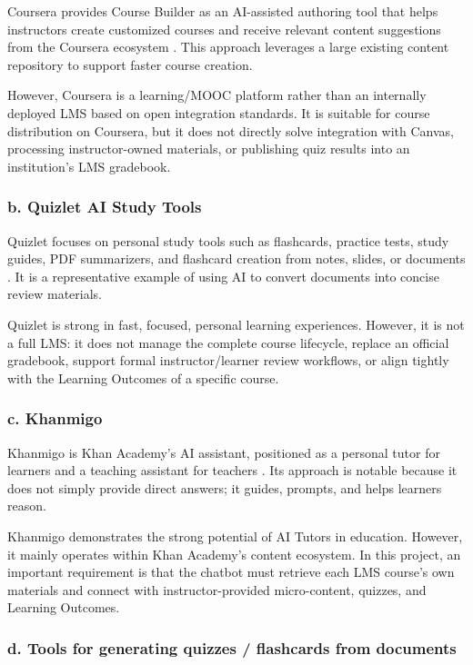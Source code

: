 Coursera provides Course Builder as an AI-assisted authoring tool that helps
instructors create customized courses and receive relevant content suggestions
from the Coursera ecosystem \cite{coursera-builder}. This approach leverages a
large existing content repository to support faster course creation.

However, Coursera is a learning/MOOC platform rather than an internally
deployed LMS based on open integration standards. It is suitable for course
distribution on Coursera, but it does not directly solve integration with
Canvas, processing instructor-owned materials, or publishing quiz results into
an institution's LMS gradebook.

\subsubsection*{b. Quizlet AI Study Tools}

Quizlet focuses on personal study tools such as flashcards, practice tests,
study guides, PDF summarizers, and flashcard creation from notes, slides, or
documents \cite{quizlet-ai}. It is a representative example of using AI to
convert documents into concise review materials.

Quizlet is strong in fast, focused, personal learning experiences. However, it
is not a full LMS: it does not manage the complete course lifecycle, replace an
official gradebook, support formal instructor/learner review workflows, or
align tightly with the Learning Outcomes of a specific course.

\subsubsection*{c. Khanmigo}

Khanmigo is Khan Academy's AI assistant, positioned as a personal tutor for
learners and a teaching assistant for teachers \cite{khanmigo}. Its approach is
notable because it does not simply provide direct answers; it guides, prompts,
and helps learners reason.

Khanmigo demonstrates the strong potential of AI Tutors in education. However,
it mainly operates within Khan Academy's content ecosystem. In this project, an
important requirement is that the chatbot must retrieve each LMS course's own
materials and connect with instructor-provided micro-content, quizzes, and
Learning Outcomes.

\subsubsection*{d. Tools for generating quizzes / flashcards from documents}

